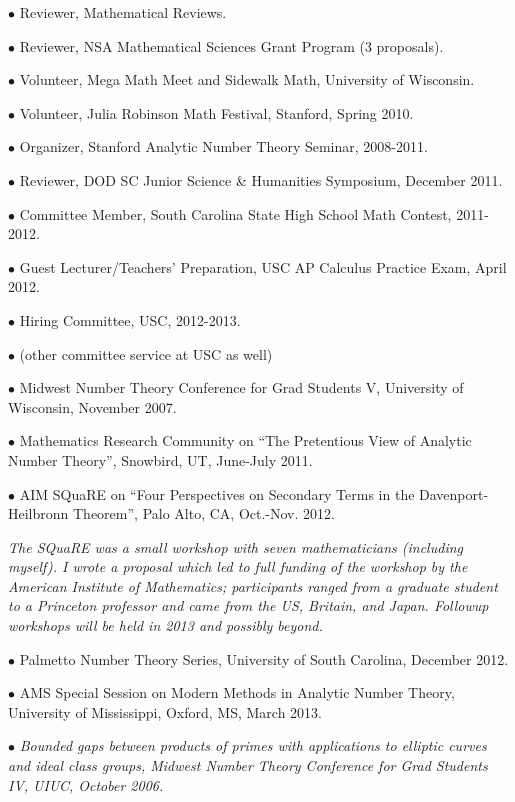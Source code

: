 \documentclass{article}
\newcommand{\categorywidth}{1in}        %
\newcommand{\categorysep}{5pt}
\newcommand{\catlistlabel}[1]%
{\raisebox{0pt}[1ex][0pt]{\makebox[\labelwidth][l]%
    {\parbox[t]{\labelwidth}{\hspace{0pt}\textbf{#1}}}}}
\newenvironment{categories}{\begin{list}{}{
      \setlength{\labelwidth}{\categorywidth}
      \setlength{\leftmargin}{\labelwidth}
      \addtolength{\leftmargin}{\labelsep}
      \setlength{\topsep}{20pt}
      \setlength{\itemsep}{\categorysep}
      \renewcommand{\makelabel}{\catlistlabel}
      }}{\end{list}}
\newcommand{\category}[1]{\item[#1]}
\begin{document}
\begin{flushleft}
\begin{categories}
{$\bullet$ {Reviewer, Mathematical Reviews.}

$\bullet$ {Reviewer, NSA Mathematical Sciences Grant Program (3 proposals).}

$\bullet$ {Volunteer, Mega Math Meet and Sidewalk Math, University of Wisconsin.}

$\bullet$ {Volunteer, Julia Robinson Math Festival, Stanford, Spring 2010.}
 
$\bullet$ Organizer, Stanford Analytic Number Theory Seminar, 2008-2011.

$\bullet$ Reviewer, DOD SC Junior Science \& Humanities Symposium, December 2011.

$\bullet$ Committee Member, South Carolina State High School Math Contest, 2011-2012.

$\bullet$ Guest Lecturer/Teachers' Preparation, USC AP Calculus Practice Exam, April 2012.

$\bullet$ Hiring Committee, USC, 2012-2013.

$\bullet$ (other committee service at USC as well)

\category{Conferences Organized}

$\bullet$ Midwest Number Theory Conference for Grad Students V, University of Wisconsin, November 2007.

$\bullet$ Mathematics Research Community on ``The Pretentious View of Analytic Number Theory'', Snowbird, UT, June-July 2011.

$\bullet$ AIM SQuaRE on ``Four Perspectives on Secondary Terms in the Davenport-Heilbronn Theorem'', Palo Alto, CA, Oct.-Nov. 2012.

{\itshape The SQuaRE was a small workshop with seven mathematicians (including myself). I wrote a proposal which led to full funding
of the workshop by the American Institute of Mathematics; 
participants ranged from a graduate student to a Princeton professor and came from the US, Britain, and Japan. Followup workshops
will be held in 2013 and possibly beyond.}

$\bullet$ Palmetto Number Theory Series, University of South Carolina, December 2012.

$\bullet$ AMS Special Session on Modern Methods in Analytic Number Theory, University of Mississippi, Oxford, MS, March 2013.

\category{Research Talks}

$\bullet$ {\itshape Bounded gaps between products of primes with applications to elliptic curves
and ideal class groups, Midwest Number Theory Conference for Grad Students IV\upshape, UIUC, October 2006.}

}
\end{categories}
\end{flushleft}
\end{document}
